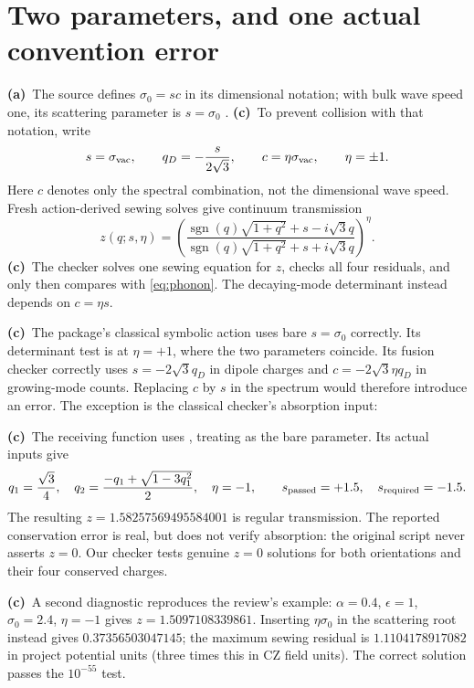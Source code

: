 \documentclass[11pt,a4paper]{article}
\newcommand{\La}{\textbf{(a)}\ }
\newcommand{\Lc}{\textbf{(c)}\ }
\newcommand{\file}[1]{\texttt{\detokenize{#1}}}
\begin{document}
\section{Two parameters, and one actual convention error}
\La The source defines $\sigma_0=sc$ in its dimensional notation; with bulk
wave speed one, its scattering parameter is $s=\sigma_0$ \cite[Sec.~5.1]{CZ}.
\Lc To prevent collision with that notation, write
\begin{equation}
 s=\sigma_{\rm vac},\qquad q_D=-\frac{s}{2\sqrt3},\qquad
 c=\eta\sigma_{\rm vac},\qquad \eta=\pm1.
 \label{eq:dictionary}
\end{equation}
Here $c$ denotes only the spectral combination, not the dimensional wave
speed. Fresh action-derived sewing solves give continuum transmission
\begin{equation}
 z(q;s,\eta)=\left(
 \frac{\operatorname{sgn}(q)\sqrt{1+q^2}+s-i\sqrt3q}
 {\operatorname{sgn}(q)\sqrt{1+q^2}+s+i\sqrt3q}\right)^\eta.
 \label{eq:phonon}
\end{equation}
\Lc The checker solves one sewing equation for $z$, checks all four residuals,
and only then compares with \eqref{eq:phonon}. The decaying-mode determinant
instead depends on $c=\eta s$.

\Lc The package's classical symbolic action uses bare $s=\sigma_0$ correctly.
Its determinant test is at $\eta=+1$, where the two parameters coincide.
Its fusion checker correctly uses $s=-2\sqrt3q_D$ in dipole charges and
$c=-2\sqrt3\eta q_D$ in growing-mode counts. Replacing $c$ by $s$ in the
spectrum would therefore introduce an error. The exception is the classical
checker's absorption input:
\begin{quote}\small
\file{s_abs = -2 * r3 * q1 * eta_abs}
\end{quote}
\Lc The receiving function uses \file{qD = -s_val / (2 * r3)}, treating
\file{s_val} as the bare parameter. Its actual inputs give
\begin{equation}
 q_1=\frac{\sqrt3}{4},\quad
 q_2=\frac{-q_1+\sqrt{1-3q_1^2}}2,\quad \eta=-1,
 \qquad s_{\rm passed}=+1.5,\quad s_{\rm required}=-1.5.
\end{equation}
The resulting $z=1.58257569495584001$ is regular transmission. The reported
conservation error is real, but does not verify absorption: the original
script never asserts $z=0$. Our checker tests genuine $z=0$ solutions for
both orientations and their four conserved charges.

\Lc A second diagnostic reproduces the review's example:
$\alpha=0.4$, $\epsilon=1$, $\sigma_0=2.4$, $\eta=-1$ gives
$z=1.5097108339861$. Inserting $\eta\sigma_0$ in the scattering root instead
gives $0.37356503047145$; the maximum sewing residual is
$1.1104178917082$ in project potential units (three times this in CZ field
units). The correct solution passes the $10^{-55}$ test.
\end{document}
